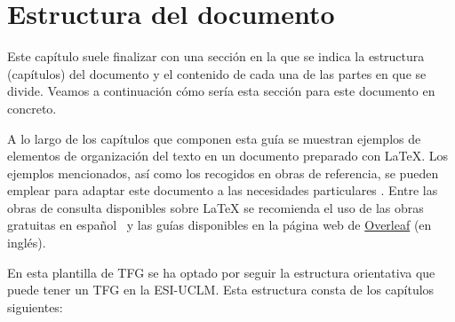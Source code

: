\section{Estructura del documento}
Este capítulo suele finalizar con una sección en la que se indica la estructura (capítulos) del documento y el contenido de cada una de las partes en que se divide. Veamos a continuación cómo sería esta sección para este documento en concreto.

A lo largo de los capítulos que componen esta guía se muestran ejemplos de elementos de organización del texto en un documento preparado con \LaTeX{}. Los ejemplos mencionados, así como los recogidos en obras de referencia, se pueden emplear para adaptar este documento a las necesidades particulares  \cite{lamport94,wikibookLaTex10}. Entre las obras de consulta disponibles sobre \LaTeX{} se recomienda el uso de las obras gratuitas en español~\cite{oetiker14,borbon21} y las guías disponibles en la página web de \href{https://es.overleaf.com/learn}{Overleaf} (en inglés).

En esta plantilla de TFG se ha optado por seguir la estructura orientativa que puede tener un TFG en la \mbox{ESI-UCLM}. Esta estructura consta de los capítulos siguientes:

